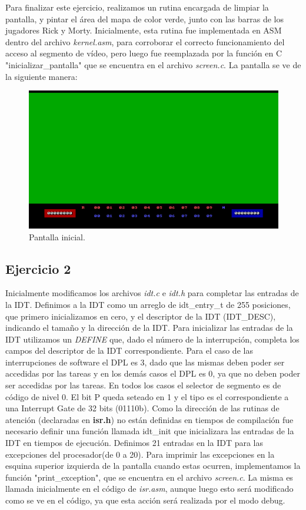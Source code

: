 \documentclass[a4paper]{article}
\begin{document}
\justify
Para finalizar este ejercicio, realizamos un rutina encargada de limpiar la pantalla, y pintar el área del mapa de color verde, junto con las barras de los jugadores Rick y Morty. Inicialmente, esta rutina fue implementada en ASM dentro del archivo \textit{kernel.asm}, para corroborar el correcto funcionamiento del acceso al segmento de vídeo, pero luego fue reemplazada por la función en C  "inicializar_pantalla" que se encuentra en el archivo \textit{screen.c}. La pantalla se ve de la siguiente manera:

\begin{figure}[h]
	\centering
	\includegraphics[scale=0.6]{img/Pantalla.pdf}
	\caption{Pantalla inicial.}
\end{figure}


\subsection{Ejercicio 2}
\justify
Inicialmente modificamos los archivos \textit{idt.c} e \textit{idt.h} para completar las entradas de la IDT. Definimos a la IDT como un arreglo de idt_entry_t de 255 posiciones, que primero inicializamos en cero, y el descriptor de la IDT (IDT_DESC), indicando el tamaño y la dirección de la IDT. Para inicializar las entradas de la IDT utilizamos un \textit{DEFINE} que, dado el número de la interrupción, completa los campos del descriptor de la IDT correspondiente. Para el caso de las interrupciones de software el DPL es 3, dado que las mismas deben poder ser accedidas por las tareas y en los demás casos el DPL es 0, ya que no deben poder ser accedidas por las tareas. En todos los casos el selector de segmento es de código de nivel 0. El bit P queda seteado en 1 y el tipo es el correspondiente a una Interrupt Gate de 32 bits (01110b). Como la dirección de las rutinas de atención (declaradas en \textbf{isr.h}) no están definidas en tiempos de compilación fue necesario definir una función llamada idt_init que inicializara las entradas de la IDT en tiempos de ejecución. Definimos 21 entradas en la IDT para las excepciones del procesador(de 0 a 20).
\justify
Para imprimir las excepciones en la esquina superior izquierda de la pantalla  cuando estas ocurren, implementamos la función "print_exception", que se encuentra en el archivo \textit{screen.c}. La misma es llamada inicialmente en el código de \textit{isr.asm}, aunque luego esto será modificado como se ve en el código, ya que esta acción será realizada por el modo debug. 
\end{document}
